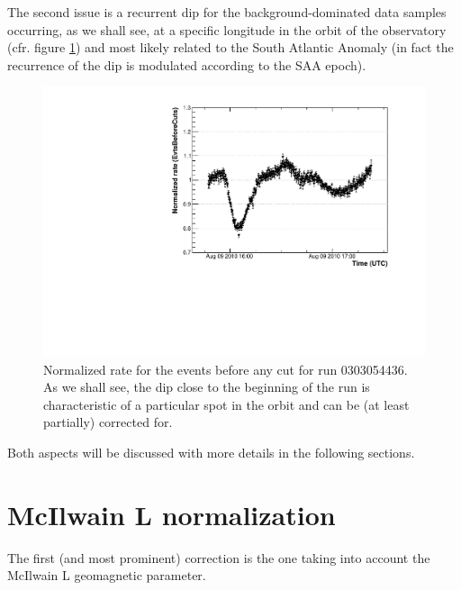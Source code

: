 \documentclass[a4paper,twocolumn]{article}
\begin{document}
The second issue is a recurrent dip for the background-dominated data samples
occurring, as we shall see, at a specific longitude in the orbit of the
observatory (cfr. figure \ref{EvtsBeforeCuts_old}) and most likely related
to the South Atlantic Anomaly (in fact the recurrence of the dip is modulated
according to the SAA epoch).
\begin{figure}[htb!]
  \begin{center}
    \includegraphics[width=\linewidth]{figures/EvtsBeforeCuts_old}
    \caption{Normalized rate for the events before any cut for run 0303054436.
      As we shall see, the dip close to the beginning of the run is
      characteristic of a particular spot in the orbit and can be (at least
      partially) corrected for.}
    \label{EvtsBeforeCuts_old}
  \end{center}
\end{figure}

Both aspects will be discussed with more details in the following sections.


\section{McIlwain L normalization}

The first (and most prominent) correction is the one taking into account
the McIlwain L geomagnetic parameter.
\end{document}
